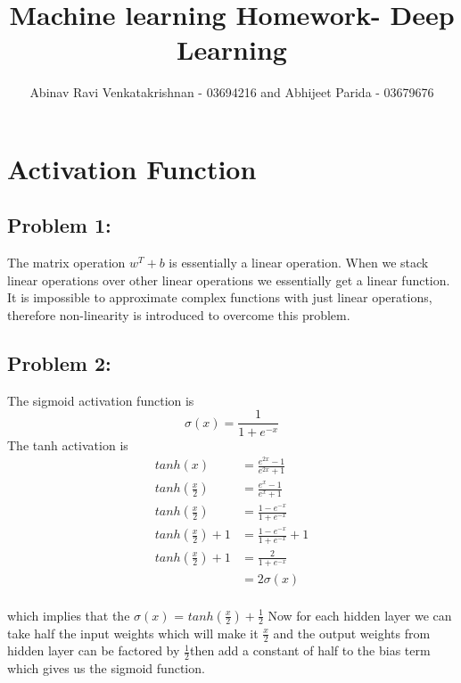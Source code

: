 \documentclass[5pt,a4paper]{article}
\begin{document}
	\title{Machine learning Homework- Deep Learning }
	\author{Abinav Ravi Venkatakrishnan - 03694216 and Abhijeet Parida - 03679676}
	\maketitle
	\section{Activation Function}
	\subsection*{Problem 1:}
	The matrix operation $w^T+b$ is essentially a linear operation. When we stack linear operations over other linear operations we essentially get a linear function. It is impossible to approximate complex functions with just linear operations, therefore non-linearity is introduced to overcome this problem.
	
	\subsection*{Problem 2:}
	The sigmoid activation function is \\
	\begin{equation*}
	\sigma(x)=\frac{1}{1+e^{-x}}
	\end{equation*}
	The tanh activation is\\
	\begin{eqnarray*}
	tanh(x)&=\frac{e^{2x}-1}{e^{2x}+1}\\
	tanh(\frac{x}{2})&=\frac{e^{x}-1}{e^{x}+1}\\
	tanh(\frac{x}{2})&=\frac{1-e^{-x}}{1+e^{-x}}\\
	tanh(\frac{x}{2})+1 &= \frac{1-e^{-x}}{1+e^{-x}}+1\\
	tanh(\frac{x}{2})+1 &= \frac{2}{1+e^{-x}}\\ &= 2 \sigma(x) \\ 	
	\end{eqnarray*}

which implies that the $ \sigma (x) $ = $ tanh(\frac{x}{2})+ \frac{1}{2} $ Now for each hidden layer we can take half the input weights which will make it $\frac{x}{2}$ and the output weights from hidden layer can be factored by $ \frac{1}{2}$then add a constant of half to the bias term which gives us the sigmoid function. 
	
\end{document}
